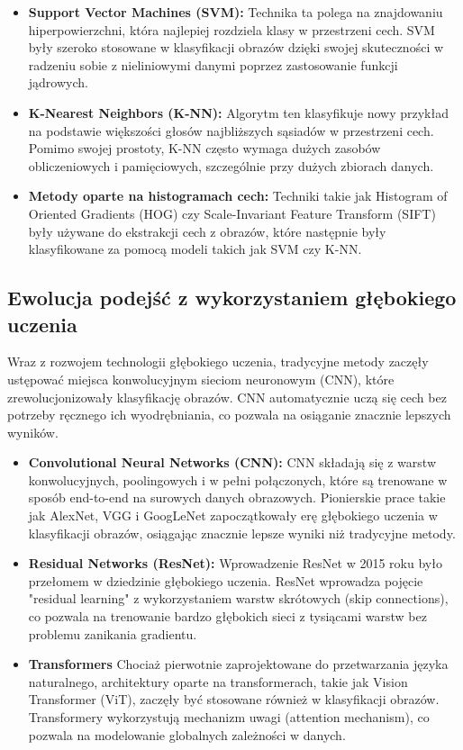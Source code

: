 \begin{itemize}
    \item \textbf{Support Vector Machines (SVM):} Technika ta polega na znajdowaniu hiperpowierzchni, 
    która najlepiej rozdziela klasy w przestrzeni cech. SVM były szeroko stosowane w klasyfikacji 
    obrazów dzięki swojej skuteczności w radzeniu sobie z nieliniowymi danymi poprzez zastosowanie 
    funkcji jądrowych.
    \item \textbf{K-Nearest Neighbors (K-NN):} Algorytm ten klasyfikuje nowy przykład na podstawie 
    większości głosów najbliższych sąsiadów w przestrzeni cech. Pomimo swojej prostoty, K-NN często 
    wymaga dużych zasobów obliczeniowych i pamięciowych, szczególnie przy dużych zbiorach danych.
    \item \textbf{Metody oparte na histogramach cech:} Techniki takie jak Histogram of Oriented 
    Gradients (HOG) czy Scale-Invariant Feature Transform (SIFT) były używane do ekstrakcji cech z 
    obrazów, które następnie były klasyfikowane za pomocą modeli takich jak SVM czy K-NN.
\end{itemize}

\subsection*{Ewolucja podejść z wykorzystaniem głębokiego uczenia}

Wraz z rozwojem technologii głębokiego uczenia, tradycyjne metody zaczęły ustępować 
miejsca konwolucyjnym sieciom neuronowym (CNN), które zrewolucjonizowały klasyfikację obrazów. 
CNN automatycznie uczą się cech bez potrzeby ręcznego ich wyodrębniania, co pozwala na osiąganie 
znacznie lepszych wyników.

\begin{itemize}
    \item \textbf{Convolutional Neural Networks (CNN):} CNN składają się z warstw konwolucyjnych, 
    poolingowych i w pełni połączonych, które są trenowane w sposób end-to-end na surowych danych 
    obrazowych. Pionierskie prace takie jak AlexNet, VGG i GoogLeNet zapoczątkowały erę głębokiego 
    uczenia w klasyfikacji obrazów, osiągając znacznie lepsze wyniki niż tradycyjne metody.
    \item \textbf{Residual Networks (ResNet):}  Wprowadzenie ResNet w 2015 roku było przełomem 
    w dziedzinie głębokiego uczenia. ResNet wprowadza pojęcie "residual learning" z wykorzystaniem 
    warstw skrótowych (skip connections), co pozwala na trenowanie bardzo głębokich sieci z tysiącami 
    warstw bez problemu zanikania gradientu.
    \item \textbf{Transformers} Chociaż pierwotnie zaprojektowane do przetwarzania języka naturalnego, 
    architektury oparte na transformerach, takie jak Vision Transformer (ViT), zaczęły być stosowane 
    również w klasyfikacji obrazów. Transformery wykorzystują mechanizm uwagi (attention mechanism), 
    co pozwala na modelowanie globalnych zależności w danych.
\end{itemize}

